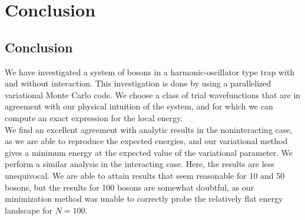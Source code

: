 \documentclass[a4paper, 10pt]{article}
\begin{document}
	 \section{Conclusion}
	\subsection{Conclusion}
	We have investigated a system of bosons in a harmonic-oscillator type trap with and without interaction. This investigation is done by using a parallelized variational Monte Carlo code. We choose a class of trial wavefunctions that are in agreement with our physical intuition of the system, and for which we can compute an exact expression for the local energy.\\
	\linebreak
	We find an excellent agreement with analytic results in the noninteracting case, as we are able to reproduce the expected energies, and our variational method gives a minimum energy at the expected value of the variational parameter. We perform a similar analysis in the interacting case. Here, the results are less unequivocal. We are able to attain results that seem reasonable for 10 and 50 bosons, but the results for 100 bosons are somewhat doubtful, as our minimization method was unable to correctly probe the relatively flat energy landscape for $N=100$.  
	
\end{document}
